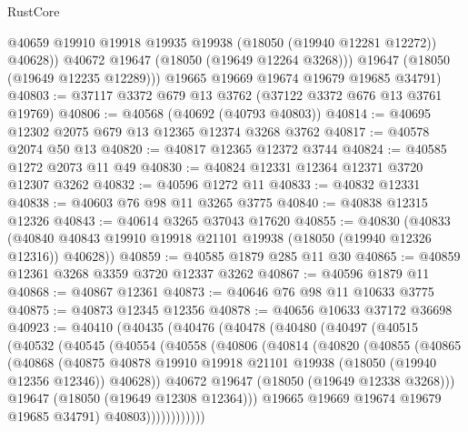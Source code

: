\begin{lexlean}{RustCore}
\begin{coremodule}
              @40659
              @19910
              @19918
              @19935
              @19938
              (@18050 (@19940 @12281 @12272))
              @40628))
          @40672
          @19647
          (@18050 (@19649 @12264 @3268)))
        @19647
        (@18050 (@19649 @12235 @12289)))
      @19665
      @19669
      @19674
      @19679
      @19685
      @34791)
@40803 := @37117 @3372 @679 @13 @3762 (@37122 @3372 @676 @13 @3761 @19769)
@40806 := @40568 (@40692 (@40793 @40803))
@40814 := @40695 @12302 @2075 @679 @13 @12365 @12374 @3268 @3762
@40817 := @40578 @2074 @50 @13
@40820 := @40817 @12365 @12372 @3744
@40824 := @40585 @1272 @2073 @11 @49
@40830 := @40824 @12331 @12364 @12371 @3720 @12307 @3262
@40832 := @40596 @1272 @11
@40833 := @40832 @12331
@40838 := @40603 @76 @98 @11 @3265 @3775
@40840 := @40838 @12315 @12326
@40843 := @40614 @3265 @37043 @17620
@40855 := @40830
    (@40833 (@40840 @40843 @19910 @19918 @21101 @19938 (@18050 (@19940 @12326 @12316)) @40628))
@40859 := @40585 @1879 @285 @11 @30
@40865 := @40859 @12361 @3268 @3359 @3720 @12337 @3262
@40867 := @40596 @1879 @11
@40868 := @40867 @12361
@40873 := @40646 @76 @98 @11 @10633 @3775
@40875 := @40873 @12345 @12356
@40878 := @40656 @10633 @37172 @36698
@40923 := @40410
    (@40435
      (@40476
        (@40478
          (@40480
            (@40497
              (@40515
                (@40532
                  (@40545
                    (@40554
                      (@40558
                        (@40806
                          (@40814
                            (@40820
                              (@40855
                                (@40865
                                  (@40868
                                    (@40875
                                      @40878
                                      @19910
                                      @19918
                                      @21101
                                      @19938
                                      (@18050 (@19940 @12356 @12346))
                                      @40628))
                                  @40672
                                  @19647
                                  (@18050 (@19649 @12338 @3268)))
                                @19647
                                (@18050 (@19649 @12308 @12364)))
                              @19665
                              @19669
                              @19674
                              @19679
                              @19685
                              @34791)
                            @40803))))))))))))

\end{coremodule}
\end{lexlean}
